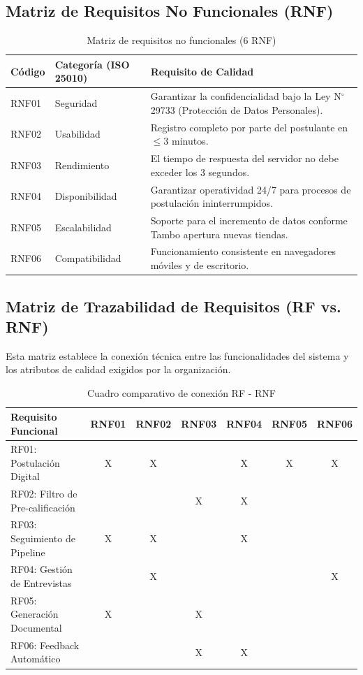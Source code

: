 \subsection{Matriz de Requisitos No Funcionales (RNF)}

\begin{table}[H]
\centering
\caption{Matriz de requisitos no funcionales (6 RNF)}
\label{tab:requisitos_no_funcionales}
\begin{tabular}{|l|l|p{8cm}|}
\hline
\textbf{Código} & \textbf{Categoría (ISO 25010)} & \textbf{Requisito de Calidad} \\ \hline
RNF01 & Seguridad & Garantizar la confidencialidad bajo la Ley N$^\circ$ 29733 (Protección de Datos Personales). \\ \hline
RNF02 & Usabilidad & Registro completo por parte del postulante en $\le 3$ minutos. \\ \hline
RNF03 & Rendimiento & El tiempo de respuesta del servidor no debe exceder los 3 segundos. \\ \hline
RNF04 & Disponibilidad & Garantizar operatividad 24/7 para procesos de postulación ininterrumpidos. \\ \hline
RNF05 & Escalabilidad & Soporte para el incremento de datos conforme Tambo apertura nuevas tiendas. \\ \hline
RNF06 & Compatibilidad & Funcionamiento consistente en navegadores móviles y de escritorio. \\ \hline
\end{tabular}
\end{table}

\subsection{Matriz de Trazabilidad de Requisitos (RF vs. RNF)}

Esta matriz establece la conexión técnica entre las funcionalidades del sistema y los atributos de calidad exigidos por la organización.

\begin{table}[H]
\centering
\caption{Cuadro comparativo de conexión RF - RNF}
\label{tab:trazabilidad}
\small
\begin{tabularx}{\textwidth}{|X|c|c|c|c|c|c|}
\hline
\textbf{Requisito Funcional} & \textbf{RNF01} & \textbf{RNF02} & \textbf{RNF03} & \textbf{RNF04} & \textbf{RNF05} & \textbf{RNF06} \\ \hline
RF01: Postulación Digital        & X & X &   & X & X & X \\ \hline
RF02: Filtro de Pre-calificación &   &   & X & X &   &   \\ \hline
RF03: Seguimiento de Pipeline    & X & X &   & X &   &   \\ \hline
RF04: Gestión de Entrevistas     &   & X &   &   &   & X \\ \hline
RF05: Generación Documental      & X &   & X &   &   &   \\ \hline
RF06: Feedback Automático        &   &   & X & X &   &   \\ \hline
\end{tabularx}
\end{table}


